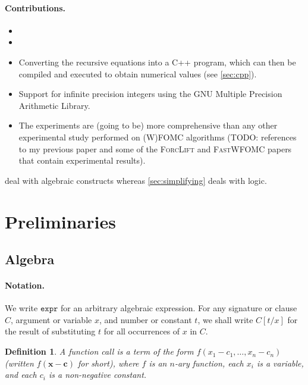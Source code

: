 \documentclass{article}
\newtheorem{definition}{Definition}
\newcommand{\expr}{\mathtt{expr}}
\begin{document}
\paragraph{Contributions.}
\begin{itemize}
  \item {}
  \item {}
  \item Converting the recursive equations into a C++ program, which can then be
        compiled and executed to obtain numerical values (see \cref{sec:cpp}).
  \item Support for infinite precision integers using the GNU Multiple Precision
        Arithmetic Library.
  \item The experiments are (going to be) more comprehensive than any other
        experimental study performed on (W)FOMC algorithms (TODO: references to
        my previous paper and some of the \textsc{ForcLift} and
        \textsc{FastWFOMC} papers that contain experimental results).
\end{itemize}

 deal with algebraic constructs whereas
\cref{sec:simplifying} deals with logic.

\section{Preliminaries}

\subsection{Algebra}

\paragraph{Notation.}
We write $\expr{}$ for an arbitrary algebraic expression. For any signature or
clause $C$, argument or variable $x$, and number or constant $t$, we shall write
$C[t / x]$ for the result of substituting $t$ for all occurrences of $x$ in $C$.

\begin{definition}
  A \emph{function call} is a term of the form
  $f(x_{1} - c_{1}, \dots, x_{n} - c_{n})$ (written $f(\mathbf{x} - \mathbf{c})$
  for short), where $f$ is an $n$-ary function, each $x_{i}$ is a variable, and
  each $c_{i}$ is a non-negative constant.
\end{definition}
\end{document}
